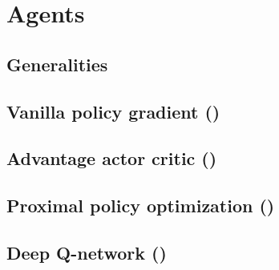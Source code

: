 \chapter{Agents}

\section{Generalities}

\section{Vanilla policy gradient (\vpg)}

\section{Advantage actor critic (\atc)}

\section{Proximal policy optimization (\ppo)}

\section{Deep Q-network (\dqn)}


